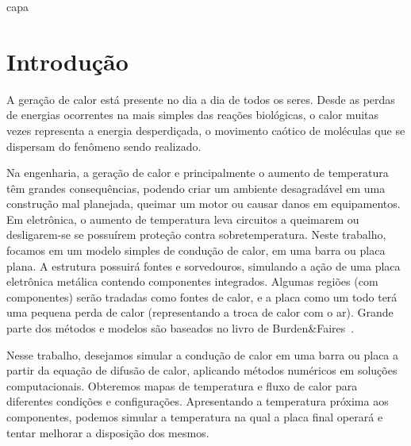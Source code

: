 \documentclass[12pt,fleqn]{article}
\begin{document}
\pagestyle {empty}

 {capa}

\pagestyle {empty}

\newpage

\tableofcontents

\pagestyle {plain}

\setcounter{page}{0} 

\setlength{\parindent}{0in}  %
\parskip 5pt
\newpage
\section{Introdução}
A geração de calor está presente no dia a dia de todos os seres. Desde as perdas de energias ocorrentes na mais simples das reações biológicas, o calor muitas vezes representa a energia desperdiçada, o movimento caótico de moléculas que se dispersam do fenômeno sendo realizado.

Na engenharia, a geração de calor e principalmente o aumento de temperatura têm grandes consequências, podendo criar um ambiente desagradável em uma construção mal planejada, queimar um motor ou causar danos em equipamentos. Em eletrônica, o aumento de temperatura leva circuitos a queimarem ou desligarem-se se possuírem proteção contra sobretemperatura. Neste trabalho, focamos em um modelo simples de condução de calor, em uma barra ou placa plana. A estrutura possuirá fontes e sorvedouros, simulando a ação de uma placa eletrônica metálica contendo componentes integrados. Algumas regiões (com componentes) serão tradadas como fontes de calor, e a placa como um todo terá uma pequena perda de calor (representando a troca de calor com o ar). Grande parte dos métodos e modelos são baseados no livro de Burden\&Faires~\cite{livro}.

Nesse trabalho, desejamos simular a condução de calor em uma barra ou placa a partir da equação de difusão de calor, aplicando métodos numéricos em soluções computacionais. Obteremos mapas de temperatura e fluxo de calor para diferentes condições e configurações. Apresentando a temperatura próxima aos componentes, podemos simular a temperatura na qual a placa final operará e tentar melhorar a disposição dos mesmos.
\end{document}
